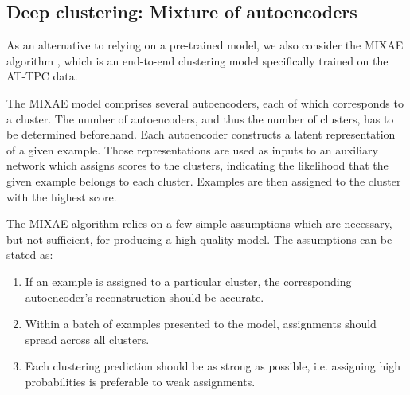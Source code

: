 \documentclass[review,number,sort&compress]{elsarticle}
\newcommand{\R}{\mathbb{R}}
\begin{document}


\subsection{Deep clustering: Mixture of autoencoders}\label{sec:mixae}

As an alternative to relying on a pre-trained model, we also consider the MIXAE algorithm \cite{Zhang}, which is an end-to-end clustering model specifically trained on the AT-TPC data.

The MIXAE model comprises several autoencoders, each of which corresponds to a cluster. The number of autoencoders, and thus the number of clusters, has to be determined beforehand. Each autoencoder constructs a latent representation of a given example. Those representations are used as inputs to an auxiliary network which assigns scores to the clusters, indicating the likelihood that the given example belongs to each cluster. Examples are then assigned to the cluster with the highest score.  


The MIXAE algorithm relies on a few simple assumptions which are necessary, but not sufficient, for producing a high-quality model. The assumptions can be stated as: 
\begin{enumerate}
	\item  If an example is assigned to a particular cluster, the corresponding autoencoder's reconstruction should be accurate. 
	\item Within a batch of examples presented to the model, assignments should spread across all clusters. 
	\item Each clustering prediction should be as strong as possible, i.e. assigning high probabilities is preferable to weak assignments.
\end{enumerate}
\end{document}
